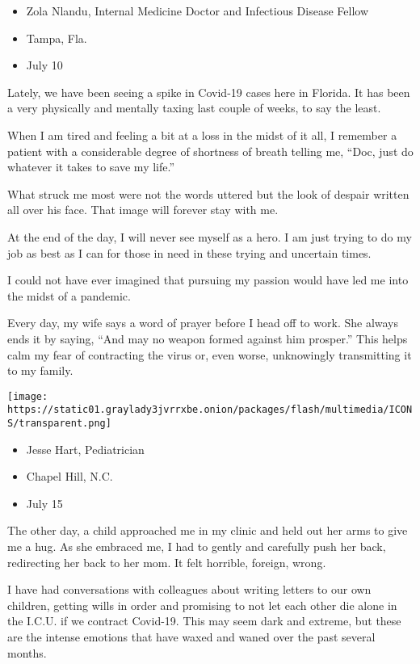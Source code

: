 \begin{itemize}
\tightlist
\item
  Zola Nlandu, Internal Medicine Doctor and Infectious Disease Fellow
\item
  Tampa, Fla.
\item
  July 10
\end{itemize}

Lately, we have been seeing a spike in Covid-19 cases here in Florida.
It has been a very physically and mentally taxing last couple of weeks,
to say the least.

When I am tired and feeling a bit at a loss in the midst of it all, I
remember a patient with a considerable degree of shortness of breath
telling me, ``Doc, just do whatever it takes to save my life.''

What struck me most were not the words uttered but the look of despair
written all over his face. That image will forever stay with me.

At the end of the day, I will never see myself as a hero. I am just
trying to do my job as best as I can for those in need in these trying
and uncertain times.

I could not have ever imagined that pursuing my passion would have led
me into the midst of a pandemic.

Every day, my wife says a word of prayer before I head off to work. She
always ends it by saying, ``And may no weapon formed against him
prosper.'' This helps calm my fear of contracting the virus or, even
worse, unknowingly transmitting it to my family.

\texttt{[image: https://static01.graylady3jvrrxbe.onion/packages/flash/multimedia/ICONS/transparent.png]}

\begin{itemize}
\tightlist
\item
  Jesse Hart, Pediatrician
\item
  Chapel Hill, N.C.
\item
  July 15
\end{itemize}

The other day, a child approached me in my clinic and held out her arms
to give me a hug. As she embraced me, I had to gently and carefully push
her back, redirecting her back to her mom. It felt horrible, foreign,
wrong.

I have had conversations with colleagues about writing letters to our
own children, getting wills in order and promising to not let each other
die alone in the I.C.U. if we contract Covid-19. This may seem dark and
extreme, but these are the intense emotions that have waxed and waned
over the past several months.

